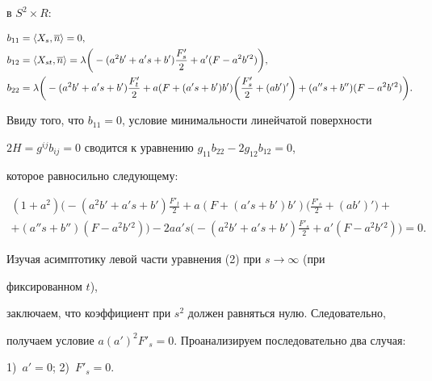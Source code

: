 \begin{pf}
в $S^2 \times R$:


\begin{align*}


b_{11}&=\la X_s, \overline n\ra =0,\\


%


b_{12}&=\la X_{st}, \overline n\ra= \lambda \bigg( -(a^2b'+a's+b')


\frac{F'_s}{2}+a'(F-a^2b'{}^2)\bigg),\\


%


b_{22}&= \lambda \bigg(-(a^2b'+a's+b') \frac{F'_t}{2}+a(F+(a's+b')b') 


\bigg( \frac{F'_s}{2}+(ab')'\bigg)+


(a''s+b'')(F-a^2b'{}^2)\bigg).


\end{align*}





Ввиду того, что $b_{11}=0$, условие минимальности линейчатой поверхности 


$2H=g^{ij}b_{ij}=0$ сводится к уравнению $g_{11}b_{22}-2g_{12}b_{12}=0$, 


которое равносильно следующему:


\begin{multline}


(1+a^2)\bigg(-(a^2b'+a's+b') \frac{F'_t}{2}+a(F+(a's+b')b')


\bigg(\frac{F'_s}{2}+(ab')'\bigg)+\\


%


+(a''s+b'')(F-a^2b'{}^2)\bigg)-2aa's\bigg(-(a^2b'+a's+b')


\frac{F'_s}{2}+a'(F-a^2b'{}^2)\bigg)=0.


\end{multline}





Изучая асимптотику левой части уравнения (2) при $s \to \infty $ (при 


фиксированном $t$),


заключаем, что коэффициент при $s^2$ должен равняться нулю. Следовательно, 


получаем условие $a(a')^2F'_s=0$. Проанализируем последовательно два случая:


1)~$a'=0$; 2)~$F'_s=0$.






\end{pf}
